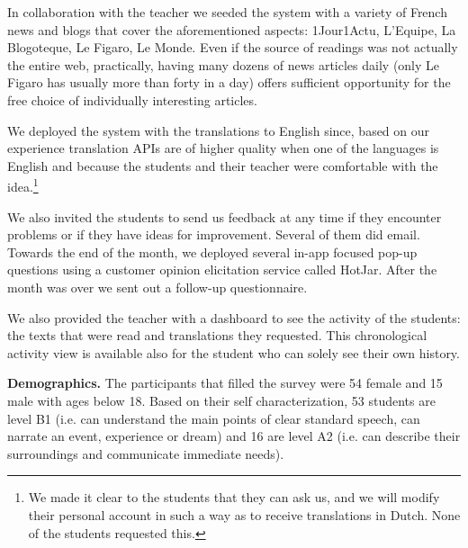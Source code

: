 In collaboration with the teacher we seeded the system with a variety of French news and blogs that cover the aforementioned aspects: 1Jour1Actu, L'Equipe, La Blogoteque, Le Figaro, Le Monde. 
% 
	Even if the source of readings was not actually the entire web, practically, having many dozens of news articles daily (only Le Figaro has usually more than forty in a day) offers sufficient opportunity for the free choice of individually interesting articles. 
	



We deployed the system with the translations to English since, based on our experience translation APIs are of higher quality when one of the languages is English and because the students and their teacher were comfortable with the idea.\footnote{We made it clear to the students that they can ask us, and we will modify their personal account in such a way as to receive translations in Dutch. None of the students requested this.}

We also invited the students to send us feedback at any time if they encounter problems or if they have ideas for improvement. Several of them did email. Towards the end of the month, we deployed several in-app focused pop-up questions using a customer opinion elicitation service called HotJar. After the month was over we sent out a follow-up questionnaire.



We also provided the teacher with a dashboard to see the activity of the students: the texts that were read and translations they requested. This chronological activity view is available also for the student who can solely see their own history.







{\bf Demographics.} 
The participants that filled the survey were 54 female and 15 male with ages below 18. Based on their self characterization, 53 students are level B1 (i.e. can understand the main points of clear standard speech, can narrate an event, experience or dream) and 16 are level A2 (i.e. can describe their surroundings and communicate immediate needs). 














